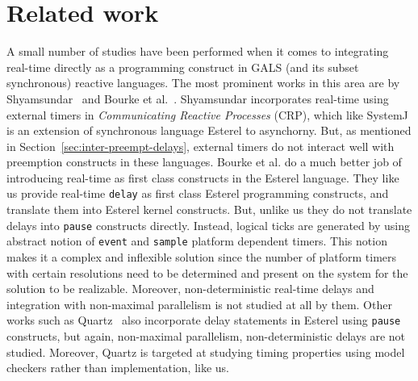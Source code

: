 \section{Related work}
\label{sec:related-work}


A small number of studies have been performed when it comes to
integrating real-time directly as a programming construct in GALS (and
its subset synchronous) reactive languages. The most prominent works in
this area are by Shyamsundar~\cite{rsh94} and Bourke et
al.~\cite{Bourke2009a}. Shyamsundar incorporates real-time using
external timers in \textit{Communicating Reactive Processes} (CRP),
which like SystemJ is an extension of synchronous language Esterel to
asynchorny. But, as mentioned in Section~\ref{sec:inter-preempt-delays},
external timers do not interact well with preemption constructs in these
languages. Bourke et al. do a much better job of introducing real-time
as first class constructs in the Esterel language. They like us provide
real-time \texttt{delay} as first class Esterel programming constructs,
and translate them into Esterel kernel constructs. But, unlike us they
do not translate delays into \texttt{pause} constructs
directly. Instead, logical ticks are generated by using abstract notion
of \texttt{event} and \texttt{sample} platform dependent timers. This
notion makes it a complex and inflexible solution since the number of
platform timers with certain resolutions need to be determined and
present on the system for the solution to be realizable. Moreover,
non-deterministic real-time delays and integration with non-maximal
parallelism is not studied at all by them. Other works such as
Quartz~\cite{glog02} also incorporate delay statements in Esterel using
\texttt{pause} constructs, but again, non-maximal parallelism,
non-deterministic delays are not studied. Moreover, Quartz is targeted
at studying timing properties using model checkers rather than
implementation, like us.




